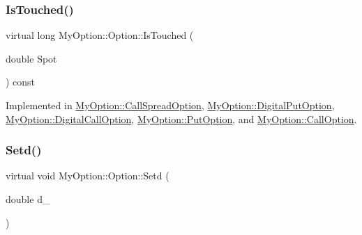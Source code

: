 \hypertarget{classMyOption_1_1Option_ade57d2fcb9f22f3c2a57d75f55444c33}{}\label{classMyOption_1_1Option_ade57d2fcb9f22f3c2a57d75f55444c33} 
\subsubsection{\texorpdfstring{Is\+Touched()}{IsTouched()}}
{\footnotesize\ttfamily virtual long My\+Option\+::\+Option\+::\+Is\+Touched (\begin{DoxyParamCaption}\item[{double}]{Spot }\end{DoxyParamCaption}) const\hspace{0.3cm}{\ttfamily [pure virtual]}}



Implemented in \hyperlink{classMyOption_1_1CallSpreadOption_a83f8cda1ab9e49df49f8d08d0bab23c7}{My\+Option\+::\+Call\+Spread\+Option}, \hyperlink{classMyOption_1_1DigitalPutOption_a6e38fdd2a8d6f6f959e5cdb0a66e4057}{My\+Option\+::\+Digital\+Put\+Option}, \hyperlink{classMyOption_1_1DigitalCallOption_a121b168de89ae10c90d2e11036588b29}{My\+Option\+::\+Digital\+Call\+Option}, \hyperlink{classMyOption_1_1PutOption_a35f98855719f9920fa8176deb6bfd75b}{My\+Option\+::\+Put\+Option}, and \hyperlink{classMyOption_1_1CallOption_a397e70701e8a882e0205193513d27b97}{My\+Option\+::\+Call\+Option}.

\hypertarget{classMyOption_1_1Option_a383adfb2fada8d93eed4afac50c53955}{}\label{classMyOption_1_1Option_a383adfb2fada8d93eed4afac50c53955} 
\subsubsection{\texorpdfstring{Setd()}{Setd()}}
{\footnotesize\ttfamily virtual void My\+Option\+::\+Option\+::\+Setd (\begin{DoxyParamCaption}\item[{double}]{d\+\_\+ }\end{DoxyParamCaption})\hspace{0.3cm}{\ttfamily [virtual]}}

\hypertarget{classMyOption_1_1Option_a3d822c6f5d051ed6d02c72e3a0e7b93c}{}\label{classMyOption_1_1Option_a3d822c6f5d051ed6d02c72e3a0e7b93c} 
